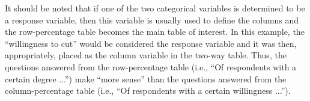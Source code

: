 \documentclass[10pt,openany]{book}\usepackage[]{graphicx}\usepackage[]{color}
\begin{document}
\vspace{-12pt}

It should be noted that if one of the two categorical variables is determined to be a response variable, then this variable is usually used to define the columns and the row-percentage table becomes the main table of interest.  In this example, the ``willingness to cut'' would be considered the response variable and it was then, appropriately, placed as the column variable in the two-way table.  Thus, the questions answered from the row-percentage table (i.e., ``Of respondents with a certain degree ...'') make ``more sense'' than the questions answered from the column-percentage table (i.e., ``Of respondents with a certain willingness ...'').

\end{document}

